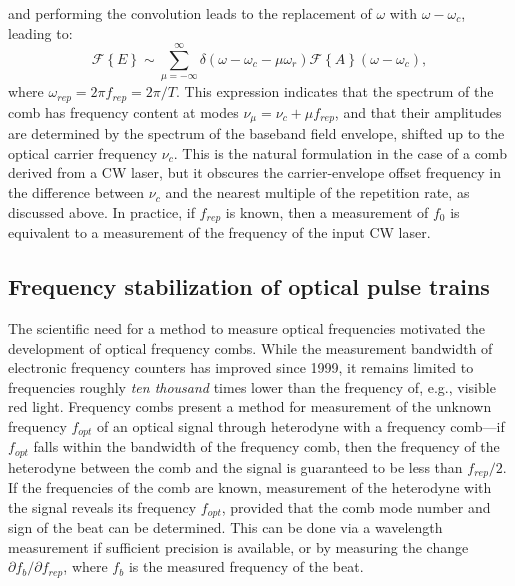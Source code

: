 and performing the convolution leads to the replacement of $\omega$ with $\omega-\omega_c$, leading to:
\begin{equation}
\mathcal{F}\left\{E\right\}\sim\sum_{\mu=-\infty}^{\infty}\delta\left(\omega-\omega_c-\mu\omega_r\right)\mathcal{F}\left\{A\right\}(\omega-\omega_c), \label{eq:combspectrum}
\end{equation}
where $\omega_{rep}=2\pi f_{rep}=2\pi/T$. This expression indicates that the spectrum of the comb has frequency content at modes $\nu_\mu=\nu_c+\mu f_{rep}$, and that their amplitudes are determined by the spectrum of the baseband field envelope, shifted up to the optical carrier frequency $\nu_c$. This is the natural formulation in the case of a comb derived from a CW laser, but it obscures the carrier-envelope offset frequency in the difference between $\nu_c$ and the nearest multiple of the repetition rate, as discussed above. In practice, if $f_{rep}$ is known, then a measurement of $f_0$ is equivalent to a measurement of the frequency of the input CW laser.


\subsection{Frequency stabilization of optical pulse trains}
\label{sec:f2f}

The scientific need for a method to measure optical frequencies motivated the development of optical frequency combs. While the measurement bandwidth of electronic frequency counters has improved since 1999, it remains limited to frequencies roughly \textit{ten thousand} times lower than the frequency of, e.g., visible red light. Frequency combs present a method for measurement of the unknown frequency $f_{opt}$ of an optical signal through heterodyne with a frequency comb---if $f_{opt}$ falls within the bandwidth of the frequency comb, then the frequency of the heterodyne between the comb and the signal is guaranteed to be less than $f_{rep}/2$. If the frequencies of the comb are known, measurement of the heterodyne with the signal reveals its frequency  $f_{opt}$, provided that the comb mode number and sign of the beat can be determined. This can be done via a wavelength measurement if sufficient precision is available, or by measuring the change $\partial f_b/\partial f_{rep}$, where $f_b$ is the measured frequency of the beat.


